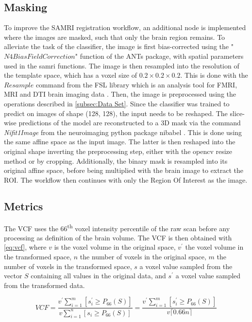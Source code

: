 \subsection{Masking}
To improve the SAMRI registration workflow, an additional node is implemented where the images are masked, such that only the brain region remains.
To alleviate the task of the classifier, the image is first bias-corrected using the "\textcolor{mg}{\texttt{$N4BiasFieldCorrection$}}" function of the ANTs package, with spatial parameters used in the samri functions.
The image is then resampled into the resolution of the template space, which has a voxel size of $0.2\times 0.2 \times 0.2$.
This is done with the \textcolor{mg}{\texttt{$Resample$}} command from the FSL library which is an analysis tool for FMRI, MRI and DTI brain imaging data \cite{fsl}.
Then, the image is preprocessed using the operations described in \cref{subsec:Data Set}.
Since the classifier was trained to predict on images of shape (128, 128), the input needs to be reshaped.
The slice-wise predictions of the model are reconstructed to a 3D mask via the command \textit{Nifit1Image} from the neuroimaging python package nibabel \cite{noauthor_neuroimaging_nodate}.
This is done using the same affine space as the input image.
The latter is then reshaped into the original shape inverting the preprocessing step, either with the opencv resize method or by cropping.
Additionally, the binary mask is resampled into its original affine space, before being multiplied with the brain image to extract the ROI.
The workflow then continues with only the Region Of Interest as the image.

\subsection{Metrics}

The VCF uses the 66\textsuperscript{th} voxel intensity percentile of the raw scan before any processing as definition of the brain volume.
The VCF is then obtained with \cref{eq:vcf}, where $v$ is the voxel volume in the original space, $v^\prime$ the voxel volume in the transformed space, $n$ the number of voxels in the original space, $m$ the number of voxels in the transformed space, $s$ a voxel value sampled from the vector $S$ containing all values in the original data, and $s^\prime$ a voxel value sampled from the transformed data.

\begin{equation} \label{eq:vcf}
        V\!C\!F
        = \frac{v^\prime\sum_{i=1}^m [s^\prime_i \geq P_{66}(S)]}{v\sum_{i=1}^n [s_i \geq P_{66}(S)]}
        = \frac{v^\prime\sum_{i=1}^m [s^\prime_i \geq P_{66}(S)]}{v \lceil0.66n\rceil}
\end{equation}

